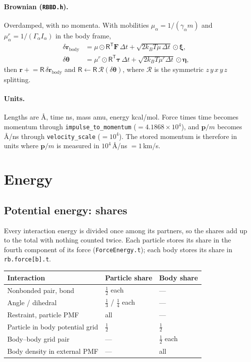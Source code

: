 \documentclass[11pt]{article}
\newcommand{\vb}[1]{\bm{#1}}
\newcommand{\code}[1]{\texttt{#1}}
\begin{document}
\paragraph{Brownian (\code{RBBD.h}).}
Overdamped, with no momenta. With mobilities $\mu_\alpha=1/(\gamma_\alpha m)$
and $\mu^{r}_\alpha=1/(\Gamma_\alpha I_\alpha)$ in the body frame,
\begin{equation}
  \begin{aligned}
  \delta\vb r_{\mathrm{body}} &= \mu\odot\mathsf R^{\mathsf T}\vb F\,\Delta t
  + \sqrt{2k_BT\mu\,\Delta t}\odot\vb\xi,\\
  \delta\vb\theta &= \mu^{r}\odot\mathsf R^{\mathsf T}\vb\tau\,\Delta t
  + \sqrt{2k_BT\mu^{r}\Delta t}\odot\vb\eta ,
  \end{aligned}
\end{equation}
then $\vb r\mathrel{+}=\mathsf R\,\delta\vb r_{\mathrm{body}}$ and
$\mathsf R\leftarrow\mathsf R\,\mathcal R(\delta\vb\theta)$, where
$\mathcal R$ is the symmetric $z\,y\,x\,y\,z$ splitting.

\paragraph{Units.} Lengths are \AA, time ns, mass amu, energy kcal/mol. Force
times time becomes momentum through \code{impulse\_to\_momentum}
($=4.1868\times10^4$), and $\vb p/m$ becomes \AA/ns through
\code{velocity\_scale} ($=10^4$). The stored momentum is therefore in units
where $\vb p/m$ is measured in $10^4$\,\AA/ns $=1$\,km/s.

\section{Energy}
\label{sec:energy}

\subsection{Potential energy: shares}

Every interaction energy is divided once among its partners, so the shares add
up to the total with nothing counted twice. Each particle stores its share in
the fourth component of its force (\code{ForceEnergy.t}); each body stores its
share in \code{rb.force[b].t}.

\begin{center}
\begin{tabular}{@{}lll@{}}
\toprule
Interaction & Particle share & Body share\\
\midrule
Nonbonded pair, bond & $\tfrac12$ each & ---\\
Angle / dihedral & $\tfrac13$ / $\tfrac14$ each & ---\\
Restraint, particle PMF & all & ---\\
Particle in body potential grid & $\tfrac12$ & $\tfrac12$\\
Body--body grid pair & --- & $\tfrac12$ each\\
Body density in external PMF & --- & all\\
\bottomrule
\end{tabular}
\end{center}
\end{document}
